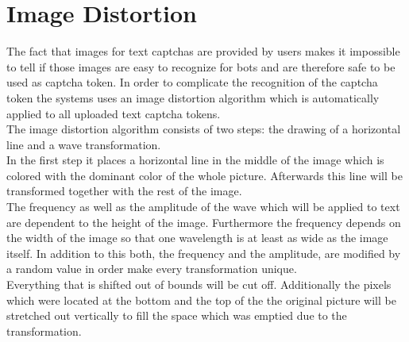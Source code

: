 \section{Image Distortion}
\label{sec:image_distortion}

The fact that images for text captchas are provided by users makes it impossible to tell if those images are easy to recognize for bots and are therefore safe to be used as captcha token. In order to complicate the recognition of the captcha token the systems uses an image distortion algorithm which is automatically applied to all uploaded text captcha tokens.\\
The image distortion algorithm consists of two steps: the drawing of a horizontal line and a wave transformation. \\
In the first step it places a horizontal line in the middle of the image which is colored with the dominant color of the whole picture. Afterwards this line will be transformed together with the rest of the image.\\
The frequency as well as the amplitude of the wave which will be applied to text are dependent to the height of the image. Furthermore the frequency depends on the width of the image so that one wavelength is at least as wide as the image itself. In addition to this both, the frequency and the amplitude, are modified by a random value in order make every transformation unique. \\
Everything that is shifted out of bounds will be cut off. Additionally the pixels which were located at the bottom and the top of the the original picture will be stretched out vertically to fill the space which was emptied due to the transformation.\\
